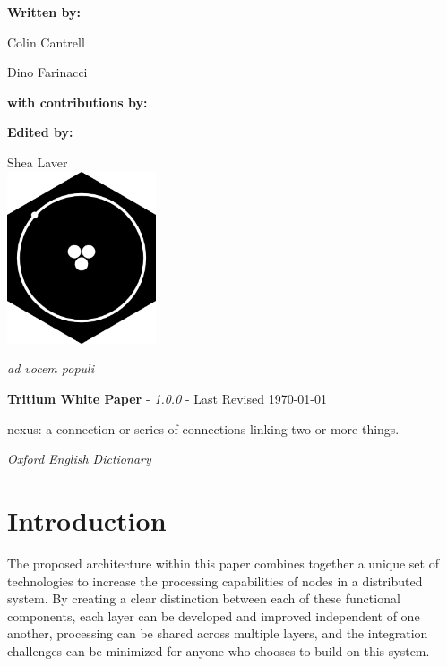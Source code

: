 \documentclass[11pt]{article}
\newcommand{\maketitlepage}[3]{
  \begingroup
  \centering
  
  \vspace*{2\baselineskip}
  
  \textbf{Written by:}\par
  \medskip
  Colin Cantrell\par
  Dino Farinacci\par

  \vspace*{2\baselineskip}

  \textbf{with contributions by:}\par\medskip
  \renewcommand\do[1]{%
    {
    \usevalue ##1:firstname \space \usevalue ##1:lastname \par}%
    }
  \docsvlist{#1}
  \vspace*{2\baselineskip}
  
  \textbf{Edited by:}\par
  \medskip
  Shea Laver
  \\
  \vspace*{3\baselineskip}
  \includegraphics[width=0.33\textwidth]{./rsz_tritium.png}
  \vspace*{1\baselineskip}
  
\begin{center}
\textit{ad vocem populi}
\end{center}  
  \pagebreak
  \endgroup
}
\begin{document}
\title{\rmfamily{}}

\date {\usvardate {}}
\maketitle
\begin{abstract}
\begin{center}
\bigskip
\noindent \textit{``Humility is the solid foundation of all virtues"}
\end{center}

\begin{flushright}
Confucius
\end{flushright}
\bigskip

\noindent Blockchain is a flourishing technology that is in a constant state of change.
Nexus is pioneering a new approach to Blockchain technology that solves the biggest challenges faced by the industry, \textbf{\textit{viz.}} scalability, ease of integration, and intuitive user experience.
Beginning with the Tritium update, we are creating an innovative software stack containing multiple layers of abstraction that will streamline business integration into the Nexus framework, form the foundation of a cryptographic identity system, and make smart contracts easily accessible through a feature-rich API set.
Each API call will be developed through a standardization process, with input from businesses, industry leaders and developers, focused on providing a well-designed interface and seamless business integration.

\end{abstract}

\newpage

\tableofcontents
\newpage
\maketitlepage{Shea, Jules, Smith, April, Steve}
\newpage


\paragraph{\textbf{Tritium White Paper} - \textit{1.0.0} - Last Revised \today }

\epigraph{nexus: a connection or series of connections linking two or more things.}{\textit{\footnotesize{Oxford English Dictionary}}}
\section{Introduction}

The proposed architecture within this paper combines together a unique set of technologies to increase the processing capabilities of nodes in a distributed system.
By creating a clear distinction between each of these functional components, each layer can be developed and improved independent of one another, processing can be shared across multiple layers, and the integration challenges can be minimized for anyone who chooses to build on this system.
\end{document}
